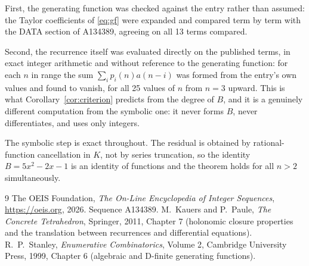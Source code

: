 \documentclass[11pt,a4paper]{article}
\theoremstyle{plain}
\theoremstyle{definition}
\begin{document}
First, the generating function was checked against the entry rather than assumed: the
Taylor coefficients of \eqref{eq:gf} were expanded and compared term by term with the DATA
section of A134389, agreeing on all 13 terms compared.

Second, the recurrence itself was evaluated directly on the published terms, in exact
integer arithmetic and without reference to the generating function: for each $n$ in range
the sum $\sum_{i}p_{i}(n)a(n-i)$ was formed from the entry's own values and found to
vanish, for all 25 values of $n$ from $n=3$ upward. This is what
Corollary~\ref{cor:criterion} predicts from the degree of $B$, and it is a genuinely
different computation from the symbolic one: it never forms $B$, never differentiates, and
uses only integers.

The symbolic step is exact throughout. The residual is obtained by rational-function
cancellation in $K$, not by series truncation, so the identity $B=5 x^{2} - 2 x - 1$ is an
identity of functions and the theorem holds for all $n>2$ simultaneously.

\begin{thebibliography}{9}
 The OEIS Foundation, \emph{The On-Line Encyclopedia of Integer Sequences},
\url{https://oeis.org}, 2026. Sequence A134389.
 M.~Kauers and P.~Paule, \emph{The Concrete Tetrahedron}, Springer, 2011,
Chapter 7 (holonomic closure properties and the translation between recurrences and
differential equations).
 R.~P.~Stanley, \emph{Enumerative Combinatorics}, Volume 2, Cambridge
University Press, 1999, Chapter 6 (algebraic and D-finite generating functions).
\end{thebibliography}
\end{document}
